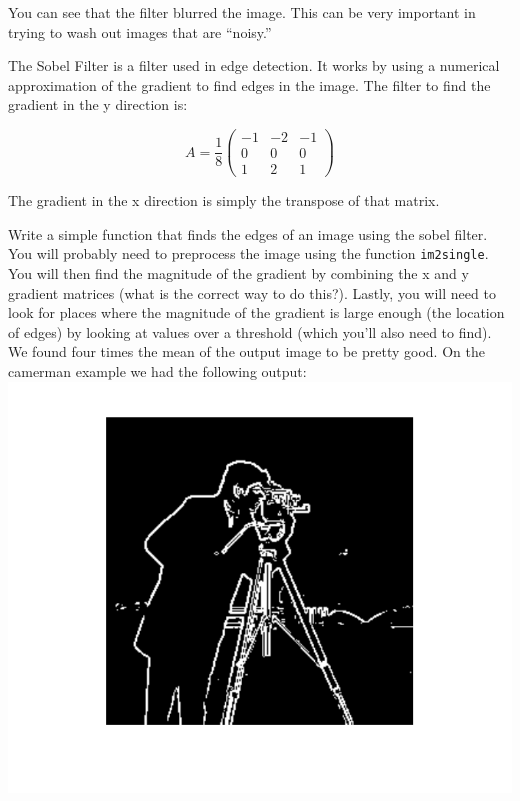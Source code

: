 You can see that the filter blurred the image. This can be very important in trying to wash out images that are ``noisy.''

\begin{problem}

The Sobel Filter is a filter used in edge detection. It works by using a numerical approximation of the gradient to find edges in the image. The filter to find the gradient in the y direction is:

\[
A = \frac{1}{8}\begin{pmatrix}
-1&-2&-1\\
0&0&0\\
1&2&1
\end{pmatrix}
\]

The gradient in the x direction is simply the transpose of that matrix.

Write a simple function that finds the edges of an image using the sobel filter. You will probably need to preprocess the image using the function {\tt im2single}. You will then find the magnitude of the gradient by combining the x and y gradient matrices (what is the correct way to do this?). Lastly, you will need to look for places where the magnitude of the gradient is large enough (the location of edges) by looking at values over a threshold (which you'll also need to find). We found four times the mean of the output image to be pretty good. On the camerman example we had the following output:
\includegraphics{./Figures/edges.pdf}
\end{problem}
